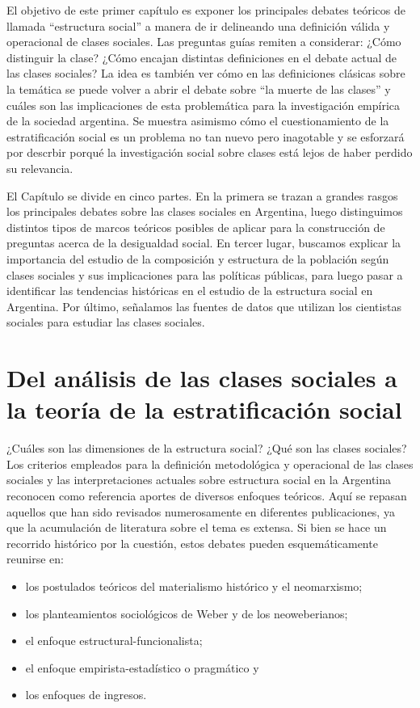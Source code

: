 \documentclass[
]{book}
\providecommand{\tightlist}{%
  \setlength{\itemsep}{0pt}\setlength{\parskip}{0pt}}
\begin{document}
El objetivo de este primer capítulo es exponer los principales debates teóricos de llamada ``estructura social'' a manera de ir delineando una definición válida y operacional de clases sociales. Las preguntas guías remiten a considerar: ¿Cómo distinguir la clase? ¿Cómo encajan distintas definiciones en el debate actual de las clases sociales? La idea es también ver cómo en las definiciones clásicas sobre la temática se puede volver a abrir el debate sobre ``la muerte de las clases'' y cuáles son las implicaciones de esta problemática para la investigación empírica de la sociedad argentina. Se muestra asimismo cómo el cuestionamiento de la estratificación social es un problema no tan nuevo pero inagotable y se esforzará por descrbir porqué la investigación social sobre clases está lejos de haber perdido su relevancia.

El Capítulo se divide en cinco partes. En la primera se trazan a grandes rasgos los principales debates sobre las clases sociales en Argentina, luego distinguimos distintos tipos de marcos teóricos posibles de aplicar para la construcción de preguntas acerca de la desigualdad social. En tercer lugar, buscamos explicar la importancia del estudio de la composición y estructura de la población según clases sociales y sus implicaciones para las políticas públicas, para luego pasar a identificar las tendencias históricas en el estudio de la estructura social en Argentina. Por último, señalamos las fuentes de datos que utilizan los cientistas sociales para estudiar las clases sociales.

\hypertarget{analisis1}{%
\section{Del análisis de las clases sociales a la teoría de la estratificación social}\label{analisis1}}

¿Cuáles son las dimensiones de la estructura social? ¿Qué son las clases sociales? Los criterios empleados para la definición metodológica y operacional de las clases sociales y las interpretaciones actuales sobre estructura social en la Argentina reconocen como referencia aportes de diversos enfoques teóricos. Aquí se repasan aquellos que han sido revisados numerosamente en diferentes publicaciones, ya que la acumulación de literatura sobre el tema es extensa. Si bien se hace un recorrido histórico por la cuestión, estos debates pueden esquemáticamente reunirse en:

\begin{itemize}
\tightlist
\item
  los postulados teóricos del materialismo histórico y el neomarxismo;
\item
  los planteamientos sociológicos de Weber y de los neoweberianos;
\item
  el enfoque estructural-funcionalista;
\item
  el enfoque empirista-estadístico o pragmático y
\item
  los enfoques de ingresos.
\end{itemize}
\end{document}
